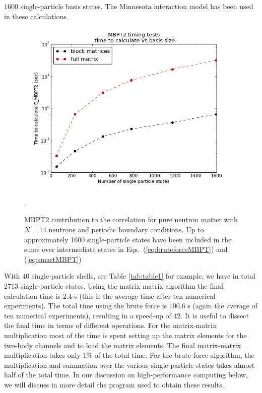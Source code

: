 $1600$ single-particle basis states. The Minnesota interaction model has been used in these calculations.  
\begin{figure}
    \includegraphics[width=\linewidth]{Chapter8-figures/blockvsfull_log.png}
    \caption{MBPT2 contribution to the correlation for pure neutron matter with $N=14$ neutrons and periodic boundary conditions. Up to approximately 1600 single-particle states have been included in the sums over intermediate states in Eqs.~(\ref{eq:bruteforceMBPT}) and (\ref{eq:smartMBPT})}. 
    \label{fig:speedup1}
  \end{figure}
With $40$ single-particle shells, see Table \ref{tab:table1} for example, we have in total  $2713$ single-particle states. 
Using the matrix-matrix algorithm the final calculation time is $2.4$ s (this is the average time after ten numerical experiments).
The total time using the brute force is $100.6$ s (again the average of ten numerical experiments), resulting in a speed-up of 42. It is useful to dissect the final time in terms of different operations.
For the matrix-matrix multiplication most of the time is spent setting up the matrix elements for the two-body channels and to load the matrix elements. The final matrix-matrix multiplication takes only $1\%$ of the total time. For the brute force algorithm, the multiplication and summation over the various single-particle states takes almost half of the total time. In our discussion on high-performance computing below, we will discuss in more detail the program used to obtain these results.



